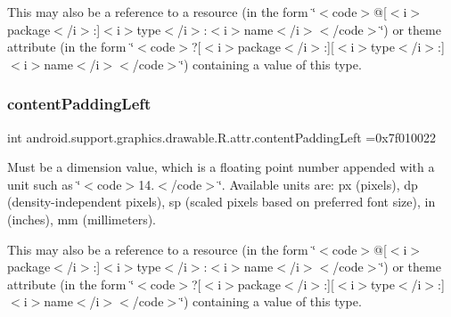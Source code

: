 This may also be a reference to a resource (in the form \char`\"{}$<$code$>$@\mbox{[}$<$i$>$package$<$/i$>$\+:\mbox{]}$<$i$>$type$<$/i$>$\+:$<$i$>$name$<$/i$>$$<$/code$>$\char`\"{}) or theme attribute (in the form \char`\"{}$<$code$>$?\mbox{[}$<$i$>$package$<$/i$>$\+:\mbox{]}\mbox{[}$<$i$>$type$<$/i$>$\+:\mbox{]}$<$i$>$name$<$/i$>$$<$/code$>$\char`\"{}) containing a value of this type. \mbox{\label{classandroid_1_1support_1_1graphics_1_1drawable_1_1R_1_1attr_a54922645e3e1b2cd7ed30601f82d4f48}} 
\subsubsection{\texorpdfstring{content\+Padding\+Left}{contentPaddingLeft}}
{\footnotesize\ttfamily int android.\+support.\+graphics.\+drawable.\+R.\+attr.\+content\+Padding\+Left =0x7f010022\hspace{0.3cm}{\ttfamily [static]}}

Must be a dimension value, which is a floating point number appended with a unit such as \char`\"{}$<$code$>$14.\+5sp$<$/code$>$\char`\"{}. Available units are\+: px (pixels), dp (density-\/independent pixels), sp (scaled pixels based on preferred font size), in (inches), mm (millimeters). 

This may also be a reference to a resource (in the form \char`\"{}$<$code$>$@\mbox{[}$<$i$>$package$<$/i$>$\+:\mbox{]}$<$i$>$type$<$/i$>$\+:$<$i$>$name$<$/i$>$$<$/code$>$\char`\"{}) or theme attribute (in the form \char`\"{}$<$code$>$?\mbox{[}$<$i$>$package$<$/i$>$\+:\mbox{]}\mbox{[}$<$i$>$type$<$/i$>$\+:\mbox{]}$<$i$>$name$<$/i$>$$<$/code$>$\char`\"{}) containing a value of this type. \mbox{\label{classandroid_1_1support_1_1graphics_1_1drawable_1_1R_1_1attr_aa00be535521f7ba8f941a6bdd563eff7}} 
